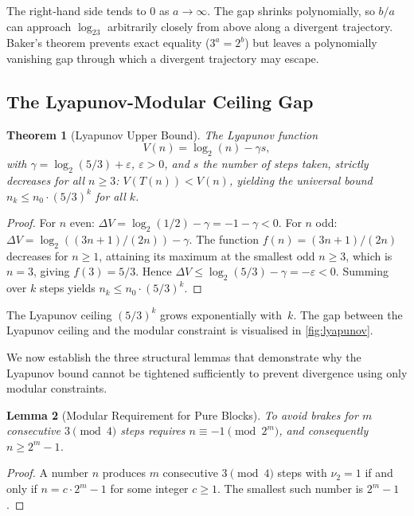 \documentclass[12pt,a4paper]{article}
\newtheorem{theorem}{Theorem}[section]
\newtheorem{lemma}[theorem]{Lemma}
\theoremstyle{definition}
\theoremstyle{remark}
\begin{document}
The right‑hand side tends to $0$ as $a\to\infty$.
The gap shrinks polynomially, so $b/a$ can approach $\log_23$
arbitrarily closely from above along a divergent trajectory.
Baker's theorem prevents exact equality ($3^a=2^b$) but leaves a
polynomially vanishing gap through which a divergent trajectory may
escape.

\subsection{The Lyapunov-Modular Ceiling Gap}

\begin{theorem}[Lyapunov Upper Bound]\label{thm:lyapunov}
The Lyapunov function
\[
V(n)=\log_2(n)-\gamma s,
\]
with $\gamma=\log_2(5/3)+\varepsilon$, $\varepsilon>0$, and $s$ the
number of steps taken, strictly decreases for all $n\ge3$:
$V(T(n))<V(n)$, yielding the universal bound
$n_k\le n_0\cdot(5/3)^k$ for all $k$.
\end{theorem}

\begin{proof}
For $n$ even: $\Delta V=\log_2(1/2)-\gamma=-1-\gamma<0$.
For $n$ odd: $\Delta V=\log_2((3n+1)/(2n))-\gamma$.
The function $f(n)=(3n+1)/(2n)$ decreases for $n\ge1$, attaining its
maximum at the smallest odd $n\ge3$, which is $n=3$, giving
$f(3)=5/3$.
Hence $\Delta V\le\log_2(5/3)-\gamma=-\varepsilon<0$.
Summing over $k$ steps yields $n_k\le n_0\cdot(5/3)^k$.
\end{proof}

The Lyapunov ceiling $(5/3)^k$ grows exponentially with~$k$.
The gap between the Lyapunov ceiling and the modular constraint is
visualised in \cref{fig:lyapunov}.

We now establish the three structural lemmas that demonstrate why the
Lyapunov bound cannot be tightened sufficiently to prevent divergence
using only modular constraints.

\begin{lemma}[Modular Requirement for Pure Blocks]\label{lem:modular}
To avoid brakes for $m$ consecutive $3\pmod4$ steps requires
$n\equiv-1\pmod{2^m}$, and consequently $n\ge2^m-1$.
\end{lemma}

\begin{proof}
A number $n$ produces $m$ consecutive $3\pmod4$ steps with $\nu_2=1$
if and only if $n=c\cdot2^m-1$ for some integer $c\ge1$.
The smallest such number is $2^m-1$.
\end{proof}
\end{document}

